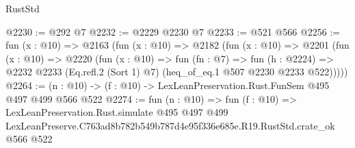 \begin{lexlean}{RustStd}
\begin{coremodule}
@2230 := @292 @7
@2232 := @2229 @2230 @7
@2233 := @521 @566
@2256 := fun (x : @10) =>
  @2163
    (fun (x : @10) =>
    @2182
      (fun (x : @10) =>
      @2201
        (fun (x : @10) =>
        @2220
          (fun (x : @10) =>
          fun (fn : @7) =>
          fun (h : @2224) =>
          @2232 @2233 (Eq.refl.{2} (Sort 1) @7) (heq_of_eq.{1} @507 @2230 @2233 @522)))))
@2264 := (n : @10) -> (f : @10) -> LexLeanPreservation.Rust.FunSem @495 @497 @499 @566 @522
@2274 := fun (n : @10) =>
  fun (f : @10) =>
  LexLeanPreservation.Rust.simulate
    @495
    @497
    @499
    LexLeanPreserve.C763ad8b782b549b787d4e95f336e685e.R19.RustStd.crate_ok
    @566
    @522
\end{coremodule}
\end{lexlean}
